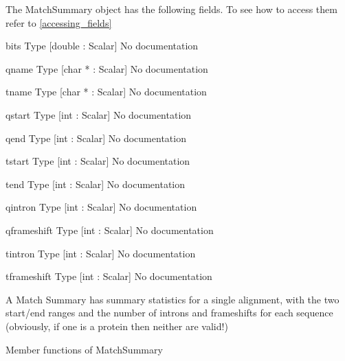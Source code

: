 The MatchSummary object has the following fields. To see how to access them refer to \ref{accessing_fields}
\begin{description}
\item{bits} Type [double : Scalar] No documentation

\item{qname} Type [char * : Scalar] No documentation

\item{tname} Type [char * : Scalar] No documentation

\item{qstart} Type [int : Scalar] No documentation

\item{qend} Type [int : Scalar] No documentation

\item{tstart} Type [int : Scalar] No documentation

\item{tend} Type [int : Scalar] No documentation

\item{qintron} Type [int : Scalar] No documentation

\item{qframeshift} Type [int : Scalar] No documentation

\item{tintron} Type [int : Scalar] No documentation

\item{tframeshift} Type [int : Scalar] No documentation

\end{description}
A Match Summary has summary statistics
for a single alignment, with the
two start/end ranges and the number of
introns and frameshifts for each
sequence (obviously, if one is a protein
then neither are valid!)




Member functions of MatchSummary

